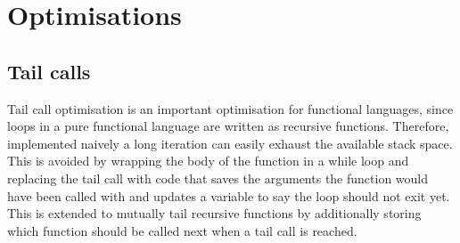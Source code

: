 \section{Optimisations}
\subsection{Tail calls}
Tail call optimisation is an important optimisation for functional languages, since loops in a pure functional language are written as recursive functions. Therefore, implemented naively a long iteration can easily exhaust the available stack space. This is avoided by wrapping the body of the function in a while loop and replacing the tail call with code that saves the arguments the function would have been called with and updates a variable to say the loop should not exit yet. This is extended to mutually tail recursive functions by additionally storing which function should be called next when a tail call is reached.

